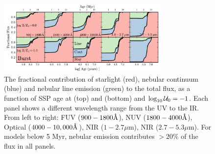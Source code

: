\begin{figure}[!htbp]
  \begin{centering}
    \includegraphics[width=0.75\textwidth]{manuscript/chapter2/f12.pdf}
    \caption{The fractional contribution of starlight (red), nebular continuum (blue) and nebular line emission (green) to the total flux, as a function of SSP age at  (top) and  (bottom) and $\log_{10} \mathcal{U}_0=-1$. Each panel shows a different wavelength range from the UV to the IR. From left to right: FUV ($900-1800\mbox{\AA}$), NUV ($1800-4000\mbox{\AA}$), Optical ($4000-10,000\mbox{\AA}$), NIR ($1-2.7\mu$m), NIR ($2.7-5.3\mu$m). For models below 5 Myr, nebular emission contributes $>20\%$ of the flux in all panels.}
    \label{fig:nebFracFlu}
  \end{centering}
\end{figure}

